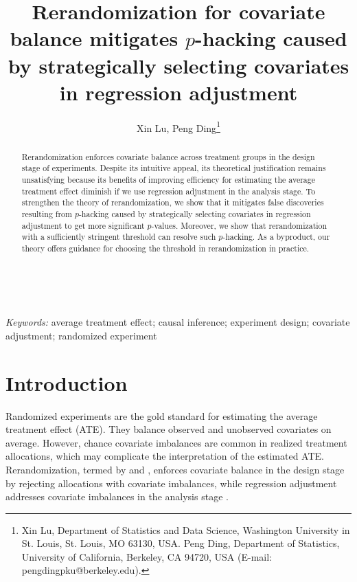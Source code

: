 \documentclass[12pt]{article}
\title{\bf Rerandomization for covariate balance mitigates $p$-hacking caused by strategically selecting covariates in regression adjustment}
\author{Xin Lu, Peng Ding\thanks{Xin Lu, Department of Statistics and Data Science, Washington University in St. Louis, St. Louis, MO 63130, USA. Peng Ding, Department of Statistics, University of California, Berkeley, CA 94720, USA (E-mail: pengdingpku@berkeley.edu).}}
\date{}
\def\spacingset#1{\renewcommand{\baselinestretch}{#1}\small\normalsize}
\begin{document}
\maketitle
\bigskip

﻿\begin{abstract}
Rerandomization enforces covariate balance across treatment groups in the design stage of experiments. Despite its intuitive appeal, its theoretical justification remains unsatisfying because its benefits of improving efficiency for estimating the average treatment effect diminish if we use regression adjustment in the analysis stage. To strengthen the theory of rerandomization, we show that it mitigates false discoveries resulting from $p$-hacking caused by strategically selecting covariates in regression adjustment to get more significant $p$-values. Moreover, we show that rerandomization with a sufficiently stringent threshold can resolve such  $p$-hacking. As a byproduct, our theory offers guidance for choosing the threshold in rerandomization in practice.
\end{abstract}

\noindent
{\it Keywords:} average treatment effect; causal inference; experiment design; covariate adjustment; randomized experiment

\newpage
\spacingset{1.5}

\section{Introduction}

Randomized experiments are the gold standard for estimating the average treatment effect (ATE). They balance observed and unobserved covariates on average. However, chance covariate imbalances are common in realized treatment allocations, which may complicate the interpretation of the estimated ATE.
Rerandomization, termed by \citet{cox1982randomization} and \citet{morgan2012rerandomization}, enforces covariate balance in the design stage by rejecting allocations with covariate imbalances, while regression adjustment addresses covariate imbalances in the analysis stage \citep{fisher1935design,freedman2008regression,Lin2013Agnostic}.
\end{document}
